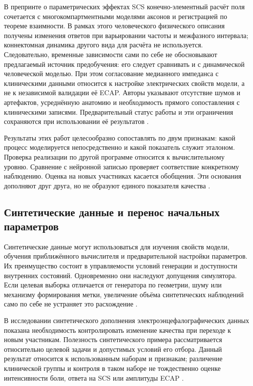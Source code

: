 В препринте о параметрических эффектах SCS конечно-элементный расчёт поля сочетается с многокомпартментными моделями аксонов и регистрацией по теореме взаимности. В рамках этого человеческого физического описания получены изменения ответов при варьировании частоты и межфазного интервала; коннектомная динамика другого вида для расчёта не используется. Следовательно, временные зависимости сами по себе не обосновывают предлагаемый источник предобучения: его следует сравнивать и с динамической человеческой моделью. При этом согласование медианного импеданса с клиническими данными относится к настройке электрических свойств модели, а не к независимой валидации её ECAP. Авторы указывают отсутствие шумов и артефактов, усреднённую анатомию и необходимость прямого сопоставления с клиническими записями. Предварительный статус работы и эти ограничения сохраняются при использовании её результатов \cite{s876}.

Результаты этих работ целесообразно сопоставлять по двум признакам: какой процесс моделируется непосредственно и какой показатель служит эталоном. Проверка реализации по другой программе относится к вычислительному уровню. Сравнение с нейронной записью проверяет соответствие конкретному наблюдению. Оценка на новых участниках касается обобщения. Эти основания дополняют друг друга, но не образуют единого показателя качества \cite{s285,s743}.

\subsection{Синтетические данные и перенос начальных параметров}

Синтетические данные могут использоваться для изучения свойств модели, обучения приближённого вычислителя и предварительной настройки параметров. Их преимущество состоит в управляемости условий генерации и доступности внутренних состояний. Одновременно они наследуют допущения симулятора. Если целевая выборка отличается от генератора по геометрии, шуму или механизму формирования метки, увеличение объёма синтетических наблюдений само по себе не устраняет это расхождение \cite{s285,s836}.

В исследовании синтетического дополнения электроэнцефалографических данных показана необходимость контролировать изменение качества при переходе к новым участникам. Полезность синтетического примера рассматривается относительно целевой задачи и допустимых условий его отбора. Данный результат относится к использованным наборам и признакам; различение клинической группы и контроля в таком наборе не тождественно оценке интенсивности боли, ответа на SCS или амплитуды ECAP \cite{s836}.

